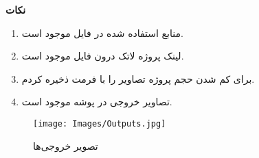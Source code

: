 \textbf{\Huge نکات}
\vspace{.5 cm}

\Large
\begin{enumerate}
    \item منابع استفاده شده در فایل  موجود است.
    \item لینک پروژه لاتک درون فایل  موجود است.
    \item برای کم شدن حجم پروژه تصاویر را با فرمت  ذخیره کردم.
    \item تصاویر خروجی در پوشه  موجود است.
\end{enumerate}

\begin{figure}[H]
    \texttt{[image: Images/Outputs.jpg]}
    \centering
    \caption{تصویر خروجی‌ها}
\end{figure}
